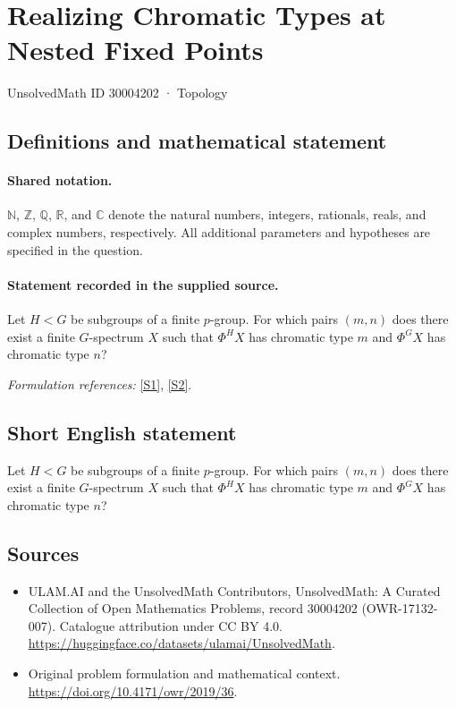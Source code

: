 \documentclass[11pt]{article}
\newcommand{\sref}[2]{\hyperlink{source:#1:#2}{[S#2]}}
\begin{document}
\setcounter{section}{30004201}
\section{Realizing Chromatic Types at Nested Fixed Points}\label{30004202}
{\small UnsolvedMath ID 30004202 · Topology}
\subsection{Definitions and mathematical statement}

\paragraph{Shared notation.}$\mathbb N$, $\mathbb Z$, $\mathbb Q$, $\mathbb R$, and $\mathbb C$ denote the natural numbers, integers, rationals, reals, and complex numbers, respectively. All additional parameters and hypotheses are specified in the question.


\paragraph{Statement recorded in the supplied source.}
Let $H<G$ be subgroups of a finite $p$-group. For which pairs $(m,n)$ does there exist a finite $G$-spectrum $X$ such that $\Phi^H X$ has chromatic type $m$ and $\Phi^G X$ has chromatic type $n$?
\par\smallskip\textit{Formulation references:} \sref{30004202}{1}, \sref{30004202}{2}.
\subsection{Short English statement}
Let $H<G$ be subgroups of a finite $p$-group. For which pairs $(m,n)$ does there exist a finite $G$-spectrum $X$ such that $\Phi^H X$ has chromatic type $m$ and $\Phi^G X$ has chromatic type $n$?
\subsection{Sources}
\begin{itemize}
\item[\hypertarget{source:30004202:1}{S1}] ULAM.AI and the UnsolvedMath Contributors, UnsolvedMath: A Curated Collection of Open Mathematics Problems, record 30004202 (OWR-17132-007). Catalogue attribution under CC BY 4.0.
\url{https://huggingface.co/datasets/ulamai/UnsolvedMath}.
\item[\hypertarget{source:30004202:2}{S2}] Original problem formulation and mathematical context.
\url{https://doi.org/10.4171/owr/2019/36}.
\end{itemize}
\label{end:30004202}
\end{document}
